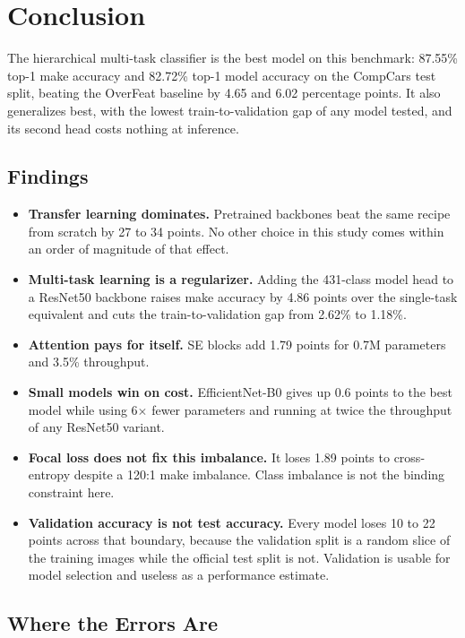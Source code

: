 
\section{Conclusion}
\label{sec:conclusions}

The hierarchical multi-task classifier is the best model on this benchmark: 87.55\% top-1 make accuracy and 82.72\% top-1 model accuracy on the CompCars test split, beating the OverFeat baseline by 4.65 and 6.02 percentage points. It also generalizes best, with the lowest train-to-validation gap of any model tested, and its second head costs nothing at inference.

\subsection{Findings}

\begin{itemize}
    \item \textbf{Transfer learning dominates.} Pretrained backbones beat the same recipe from scratch by 27 to 34 points. No other choice in this study comes within an order of magnitude of that effect.
    \item \textbf{Multi-task learning is a regularizer.} Adding the 431-class model head to a ResNet50 backbone raises make accuracy by 4.86 points over the single-task equivalent and cuts the train-to-validation gap from 2.62\% to 1.18\%.
    \item \textbf{Attention pays for itself.} SE blocks add 1.79 points for 0.7M parameters and 3.5\% throughput.
    \item \textbf{Small models win on cost.} EfficientNet-B0 gives up 0.6 points to the best model while using 6$\times$ fewer parameters and running at twice the throughput of any ResNet50 variant.
    \item \textbf{Focal loss does not fix this imbalance.} It loses 1.89 points to cross-entropy despite a 120:1 make imbalance. Class imbalance is not the binding constraint here.
    \item \textbf{Validation accuracy is not test accuracy.} Every model loses 10 to 22 points across that boundary, because the validation split is a random slice of the training images while the official test split is not. Validation is usable for model selection and useless as a performance estimate.
\end{itemize}

\subsection{Where the Errors Are}


